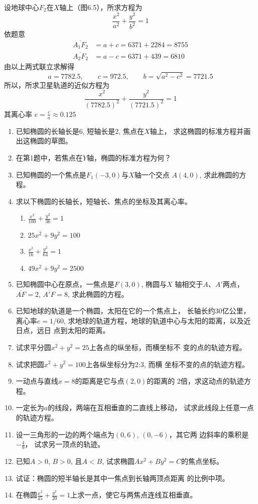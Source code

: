 \begin{solution}
    设地球中心$F_2$在$X$轴上（图6.5），所求方程为
\[\frac{x^2}{a^2}+\frac{y^2}{b^2}=1\]
依题意
\[\begin{split}
    \overline{A_1F_2}&=a+c=6371+2284=8755\\
    \overline{A_2F_2}&=a-c=6371+439=6810
\end{split}\]
由以上两式联立求解得
\[a=7782.5,\qquad c=972.5,\qquad b=\sqrt{a^2-c^2}=7721.5\]
所以，所求卫星轨道的近似方程为
\[\frac{x^2}{(7782.5)^2}+\frac{y^2}{(7721.5)^2}=1\]
其离心率
$e=\frac{c}{a}\approx 0.125$
\end{solution}

\begin{ex}
\begin{enumerate}
    \item 已知椭圆的长轴长是6, 短轴长是2, 焦点在$X$轴上，
    求这椭圆的标准方程并画出这椭圆的草图。
    \item 在第1题中，若焦点在$Y$轴，椭圆的标准方程为何？
    \item 已知椭圆的一个焦点是$F_1(-3,0)$与$X$轴一个交点
    $A(4,0)$, 求此椭圆的方程。
    \item 求以下椭圆的长轴长，短轴长、焦点的坐标及其离心率。
\begin{multicols}{2}
\begin{enumerate}
    \item $\frac{x^2}{100}+\frac{y^2}{36}=1$
    \item $25x^2+9y^2=100$
    \item $\frac{x^2}{16}+\frac{y^2}{64}=1$
    \item $49x^2+9y^2=2500$
\end{enumerate}
\end{multicols}

\item 已知椭圆中心在原点，一焦点是$F(3,0)$, 椭圆与$X$
轴相交于$A$、$A'$两点，$\overline{AF}=2$, $\overline{A'F}=8$, 求此椭圆的方程。
\item 已知地球的轨道是一个椭圆，太阳在它的一个焦点上，
长轴长约30亿公里，离心率$e=1/60$, 
求地球的轨道方程，地球的轨道中心与太阳的距离，以及近日点，远日
点到太阳的距离。
\item 试求平分圆$x^2+y^2=25$上各点的纵坐标，而横坐标不
变的点的轨迹方程。
\item 试求把圆$x^2+y^2=100$上各纵坐标分为2:3, 而横
坐标不变的点的轨迹方程。
\item 一动点与直线$x=8$的距离是它与点$(2,0)$的距离的
2倍，求这动点的轨迹方程。
\item 一定长为$a$的线段，两端在互相垂直的二直线上移动，
试求此线段上任意一点的轨迹方程。
\item 设一三角形的一边的两个端点为$(0,6)$, $(0,-6)$，其它两
边斜率的乘积是$-\frac{4}{9}$，
试求另一顶点的轨迹。
\item 已知$A>0$, $B>0$, 且$A<B$, 试求椭圆$Ax^2+By^2
=C$的焦点坐标。
\item 试证：椭圆的短半轴长是其中一焦点到长轴两顶点距离
的比例中项。
\item 在椭圆$\frac{x^2}{45}+\frac{y^2}{20}=1$上求一点，使它与两焦点连线互相垂直。
\end{enumerate}
\end{ex}

